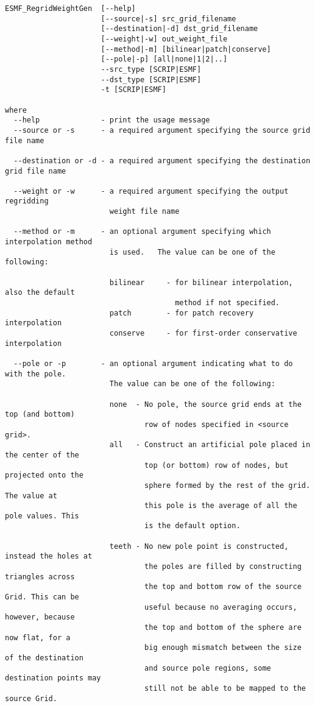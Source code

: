 \begin{verbatim}
ESMF_RegridWeightGen  [--help]
                      [--source|-s] src_grid_filename 
                      [--destination|-d] dst_grid_filename 
                      [--weight|-w] out_weight_file 
                      [--method|-m] [bilinear|patch|conserve] 
                      [--pole|-p] [all|none|1|2|..] 
                      --src_type [SCRIP|ESMF] 
                      --dst_type [SCRIP|ESMF]
                      -t [SCRIP|ESMF]

where
  --help              - print the usage message 
  --source or -s      - a required argument specifying the source grid file name

  --destination or -d - a required argument specifying the destination grid file name

  --weight or -w      - a required argument specifying the output regridding 
                        weight file name

  --method or -m      - an optional argument specifying which interpolation method
                        is used.   The value can be one of the following:

                        bilinear     - for bilinear interpolation, also the default
                                       method if not specified.
                        patch        - for patch recovery interpolation
                        conserve     - for first-order conservative interpolation

  --pole or -p        - an optional argument indicating what to do with the pole.  
                        The value can be one of the following:

                        none  - No pole, the source grid ends at the top (and bottom) 
                                row of nodes specified in <source grid>.
                        all   - Construct an artificial pole placed in the center of the 
                                top (or bottom) row of nodes, but projected onto the 
                                sphere formed by the rest of the grid. The value at 
                                this pole is the average of all the pole values. This
                                is the default option.

                        teeth - No new pole point is constructed, instead the holes at 
                                the poles are filled by constructing triangles across 
                                the top and bottom row of the source Grid. This can be
                                useful because no averaging occurs, however, because 
                                the top and bottom of the sphere are now flat, for a
                                big enough mismatch between the size of the destination
                                and source pole regions, some destination points may
                                still not be able to be mapped to the source Grid. 


\end{verbatim}
